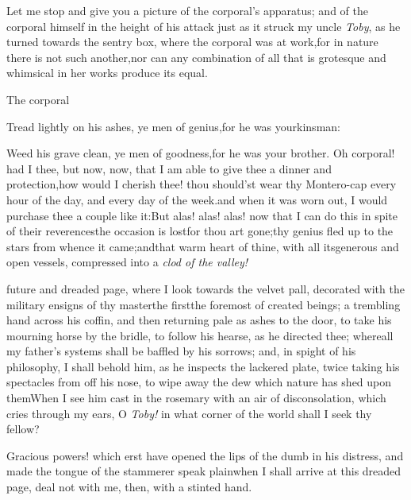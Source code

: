 \documentclass{article}
\begin{document}
Let me stop and give you a picture of the corporal’s apparatus; and of the corporal
himself in the height of his attack just as it struck my uncle \textit{Toby}, as he
turned towards the sentry box, where the corporal was at work,\tsh for in nature
there is not such another,\tsh\break nor can any combination of all that is
grotesque and whimsical in her works produce its equal.

The corporal\tsh\etp{}

\tsh Tread lightly on his ashes, ye men of
genius,\tsh for he was your\break kinsman:

Weed his grave clean, ye men of goodness,\tsk for he was your
brother.\tsk\break
Oh corporal! had I thee, but now,\tsk\break
now, that I am able to give thee a dinner and
protection,\tsk how would I cherish thee! thou should’st
wear thy Mon\-tero-cap every hour of the day, and every day of the
week.\tsk and when it was worn out, I would purchase thee a
couple like it:\tsh But alas! alas! alas!\break
now that I can do this in spite of their reverences\tsk the occasion is
lost\tsk for thou art gone;\tsk thy genius fled up to the stars
from whence it came;\tsk and\break that warm heart of thine, with all
its\break generous and open vessels, compressed into a \textit{clod of the
valley!}

\noindent
{}
future and dreaded page, where I look towards the velvet pall, decorated
with the military ensigns of thy master\tsk the\break
first\tsk the foremost of created beings;\break
{}
\break
a trembling hand across his coffin, and\break
then returning pale as ashes to the door, to take his mourning horse by the bridle,
to follow his hearse, as he directed thee;\break
\tsh where\tsk all my father’s systems
shall be baffled by his sorrows; and, in spight\break
of his philosophy, I shall behold
him, as he inspects the lackered plate, twice taking his spectacles from off his
nose, to wipe away the dew which nature has shed upon them\tsh When I see him cast
in the rosemary with an air of disconsolation, which cries through my ears,\break
\tsh O \textit{Toby!} in what corner of the world shall I seek
thy fellow?\etp{}

\tsh Gracious powers! which erst have opened the lips
of the dumb in his distress, and made the tongue of the stammerer
speak plain\tsk when I shall arrive at this dreaded page, deal
not with me, then, with a stinted hand.
\end{document}

